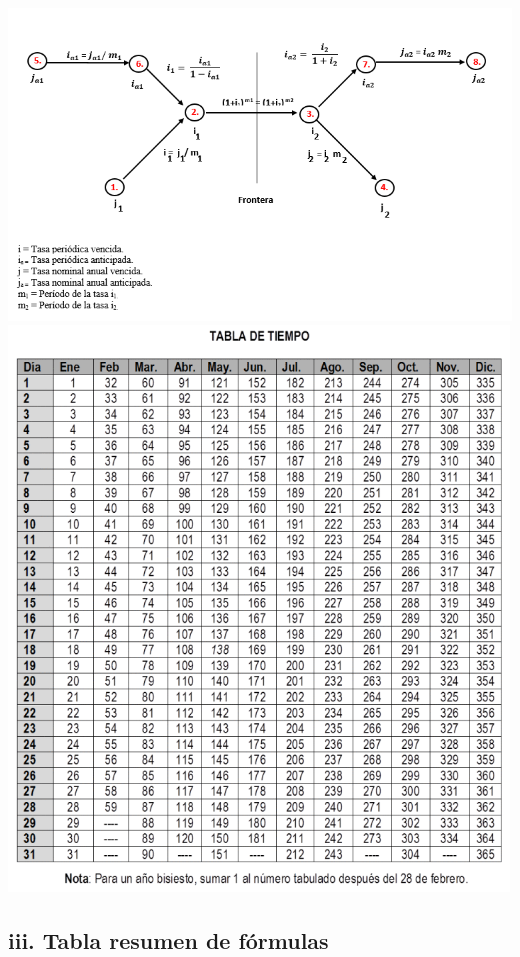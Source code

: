 \begin{spacing}{1}
\begin{center}
\clearpage
		\includegraphics[width = 10.0 cm]{general}\\
		\includegraphics[height=15cm]{TTime}
\end{center}
\end{spacing}

\clearpage

\begin{center}
\section*{iii. Tabla resumen de fórmulas}
\end{center}

